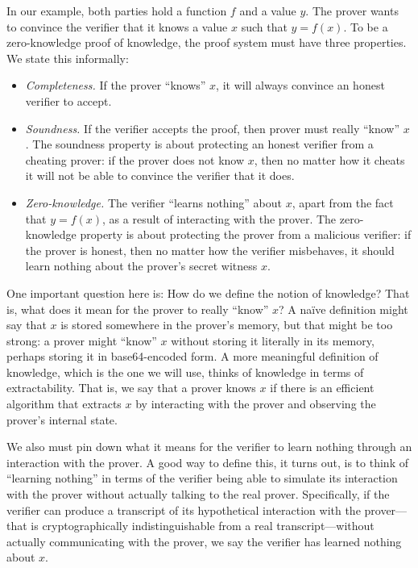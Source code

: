 In our example, both parties hold a function $f$ and a value $y$.
The prover wants to convince the verifier that it knows a value $x$ such that $y=f(x)$.
To be a zero-knowledge proof of knowledge,
the proof system must have three properties.
We state this informally:
\label{sec:zkdefn}
\begin{itemize}
\item \emph{Completeness.} If the prover ``knows'' $x$,
      it will always convince an honest verifier to accept.

\item \emph{Soundness.} If the verifier accepts the
      proof, then prover must really ``know'' $x$.
      The soundness property is about protecting
      an honest verifier from a cheating prover:
      if the prover does not know $x$, then no matter
      how it cheats it will not be able to convince
      the verifier that it does.

\item \emph{Zero-knowledge.} The verifier 
      ``learns nothing'' about $x$, apart from the fact that $y=f(x)$,
      as a result of interacting with the prover.
      The zero-knowledge property is about protecting
      the prover from a malicious verifier: if the prover
      is honest, then no matter how the verifier misbehaves,
      it should learn nothing about the prover's secret witness $x$.
\end{itemize}

One important question here is: How do we define the notion of knowledge?  
That is, what does it mean for the prover to really ``know'' $x$?
A na\"ive definition might say that $x$
is stored somewhere in the prover's memory, but that might be too strong:
a prover might ``know'' $x$ without storing it literally in its memory,
perhaps storing it in base64-encoded form.
A more meaningful definition of knowledge, which is the one we will use,
thinks of knowledge in terms of extractability.
That is, we say that a prover knows $x$ if there is an efficient 
algorithm that extracts $x$ by interacting with the prover and 
observing the prover's internal state.

We also must pin down what it means for the verifier to
learn nothing through an interaction with the prover.
A good way to define this, it turns out, is to think of
``learning nothing'' in terms of the verifier being able to simulate its
interaction with the prover without actually talking to the real prover.
Specifically, if the verifier can produce a transcript of its hypothetical
interaction with the prover---that is cryptographically indistinguishable 
from a real transcript---without actually communicating with the
prover, we say the verifier has learned nothing about $x$.

